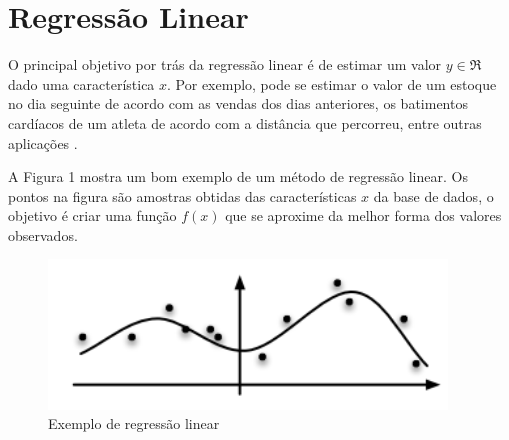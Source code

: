 \section{Regressão Linear}
O principal objetivo por trás da regressão linear é de estimar um valor $y \in \Re$ dado uma característica $x$.
Por exemplo, pode se estimar o valor de um estoque no dia seguinte de acordo com as vendas dos dias anteriores, os batimentos cardíacos de um atleta de acordo com a distância que percorreu, entre outras aplicações \cite{smola2008introduction}. 
 
 A Figura 1 mostra um bom exemplo de um método de regressão linear. Os pontos na figura são amostras obtidas das características $x$ da base de dados, o objetivo é criar uma função $f(x)$ que se aproxime da melhor forma dos valores observados.
\begin{figure}[H]
	\label{reg}
	\begin{centering}
		\includegraphics[width = 300pt]{img/regressao.png}
		\caption{Exemplo de regressão linear}
	\end{centering}	
	
\end{figure}
